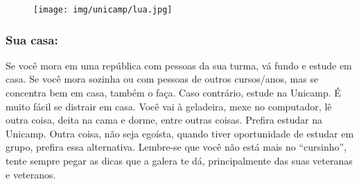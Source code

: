 
\begin{figure}[h!]  \centering
  \texttt{[image: img/unicamp/lua.jpg]}
\end{figure}

\subsubsection{Sua casa:} Se você mora em uma república com pessoas da sua
turma, vá fundo e estude em casa. Se você mora sozinha ou com pessoas de
outros cursos/anos, mas se concentra bem em casa, também o faça. Caso
contrário, estude na Unicamp. É muito fácil se distrair em casa. Você vai à
geladeira, mexe no computador, lê outra coisa, deita na cama e dorme, entre
outras coisas. Prefira estudar na Unicamp. Outra coisa, não seja egoísta,
quando tiver oportunidade de estudar em grupo, prefira essa alternativa.
Lembre-se que você não está mais no ``cursinho'', tente sempre pegar as dicas
que a galera te dá, principalmente das suas veteranas e veteranos.
